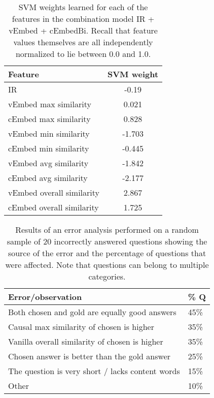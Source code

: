 \begin{table}[t]
\begin{center}
\begin{tabular}{lc}
\hline
Feature 	& SVM weight \\
\hline
IR	&	-0.19\\
vEmbed max similarity		&	0.021\\
cEmbed max similarity		&	0.828\\
vEmbed min similarity		&	-1.703\\
cEmbed min similarity		&	-0.445\\
vEmbed avg similarity		&	-1.842\\
cEmbed avg similarity		&	-2.177\\
vEmbed overall similarity	&	2.867\\
cEmbed overall similarity	&	1.725\\
\end{tabular}
\caption{{SVM weights learned for each of the features in the combination model IR + vEmbed + cEmbedBi.  Recall that feature values themselves are all independently normalized to lie between 0.0 and 1.0.}} 
\label{tab:weights}
\end{center}
\end{table}

\begin{table}[t]
\begin{center}

\begin{tabular}{ll}
\hline
Error/observation 	& \% Q \\
\hline
Both chosen and gold are equally good answers 	& 	45\% \\ 
Causal max similarity of chosen is higher		&	35\% \\
Vanilla overall similarity of chosen is higher	&	35\% \\
Chosen answer is better than the gold answer		&	25\% \\
The question is very short / lacks content words	&	15\%	 \\
Other 											&	10\% \\
\end{tabular}

\caption{{Results of an error analysis performed on a random sample of 20 incorrectly answered questions showing the source of the error and the percentage of questions that were affected. Note that questions can belong to multiple categories. }} 
\label{tab:ea}
\end{center}
\end{table}


